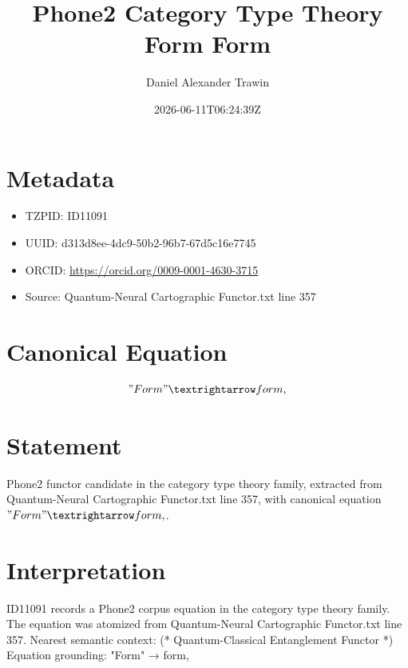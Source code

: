 \documentclass[11pt]{article}
\title{Phone2 Category Type Theory Form Form}
\author{Daniel Alexander Trawin}
\date{2026-06-11T06:24:39Z}
\begin{document}
\maketitle
\section*{Metadata}
\begin{itemize}
\item TZPID: ID11091
\item UUID: d313d8ee-4dc9-50b2-96b7-67d5c16e7745
\item ORCID: \url{https://orcid.org/0009-0001-4630-3715}
\item Source: Quantum-Neural Cartographic Functor.txt line 357
\end{itemize}
\section*{Canonical Equation}
\[
"Form" → form,
\]
\section*{Statement}
Phone2 functor candidate in the category type theory family, extracted from Quantum-Neural Cartographic Functor.txt line 357, with canonical equation $"Form" → form,$.
\section*{Interpretation}
ID11091 records a Phone2 corpus equation in the category type theory family. The equation was atomized from Quantum-Neural Cartographic Functor.txt line 357. Nearest semantic context: (* Quantum-Classical Entanglement Functor *) Equation grounding: "Form" → form,
\end{document}
